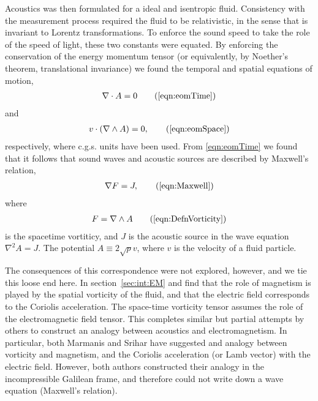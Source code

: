 \documentclass[10pt, fleqn,draft,showtrims,oldfontcommands]{article} %
\newcommand{\eqa}[1]{\begin{align}#1\end{align}}
\newcommand{\secref}[1]{section~\ref{sec:#1}}
\newcommand{\eqnref}[1]{\ref{eqn:#1}}
\newcommand{\lr}[1]{\left( #1 \right)}
\newcommand{\del}{\nabla}
\begin{document}
Acoustics was then formulated for  a ideal and isentropic fluid.
Consistency with the measurement process required the fluid to be relativistic, 
in the sense that is invariant to Lorentz transformations.
To enforce the sound speed to take the role of the speed of light, 
these two constants were equated.
By enforcing the conservation of the energy momentum tensor
(or equivalently, by Noether's theorem, translational invariance)
we found the temporal and spatial equations of motion,
\eqa{
  \del \cdot A  =0 \tag{\ref{eqn:eomTime}}
}
and
\begin{align}
v \cdot \lr{\del \wedge A} = 0, \tag{\ref{eqn:eomSpace}}
\end{align}
respectively,
where c.g.s. units have been  used.
%
%
From \eqnref{eomTime} we found that it follows that sound waves and acoustic sources are described by Maxwell's relation,
\eqa{
\del F = J, \tag{\ref{eqn:Maxwell}}
}
where 
\eqa{
  F = \del \wedge A\tag{\ref{eqn:DefnVorticity}}
} is the spacetime vortiticy,
and $J$ is the acoustic source in the wave equation $\del^2 A = J$.
The potential $A \equiv 2\sqrt p v$, where $v$ is the velocity of a fluid particle.

The consequences of this correspondence were not explored, however,
and we tie this loose end here.
In \secref{int:EM} and find that 
the role of magnetism is played by the spatial vorticity of the fluid,
and that the electric field corresponds to the Coriolis acceleration.
The space-time vorticity tensor assumes the role of the electromagnetic field tensor.
This completes similar but partial  attempts by others to construct an analogy between acoustics and electromagnetism.
In particular, both Marmanis\cite{Marmanis2000} and Srihar\cite{Sridhar1998}
have suggested and analogy between vorticity and magnetism, 
and the Coriolis acceleration (or Lamb vector) with the electric field.
However, both authors constructed their analogy in the incompressible Galilean frame, 
and therefore could not write down a wave equation (Maxwell's relation).

\end{document}
